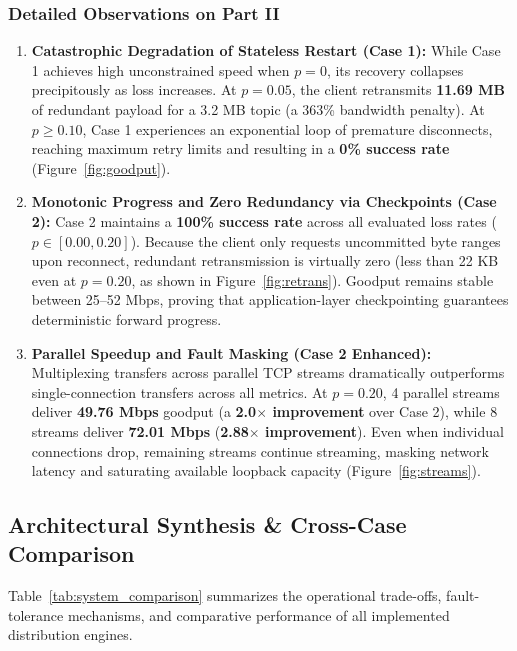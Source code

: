 \documentclass[11pt,a4paper]{article}
\begin{document}
\subsubsection{Detailed Observations on Part II}
\begin{enumerate}
    \item \textbf{Catastrophic Degradation of Stateless Restart (Case 1):}
    While Case 1 achieves high unconstrained speed when $p=0$, its recovery collapses precipitously as loss increases. At $p=0.05$, the client retransmits \textbf{11.69 MB} of redundant payload for a 3.2 MB topic (a 363\% bandwidth penalty). At $p \ge 0.10$, Case 1 experiences an exponential loop of premature disconnects, reaching maximum retry limits and resulting in a \textbf{0\% success rate} (Figure~\ref{fig:goodput}).
    
    \item \textbf{Monotonic Progress and Zero Redundancy via Checkpoints (Case 2):}
    Case 2 maintains a \textbf{100\% success rate} across all evaluated loss rates ($p \in [0.00, 0.20]$). Because the client only requests uncommitted byte ranges upon reconnect, redundant retransmission is virtually zero (less than 22 KB even at $p=0.20$, as shown in Figure~\ref{fig:retrans}). Goodput remains stable between 25--52 Mbps, proving that application-layer checkpointing guarantees deterministic forward progress.
    
    \item \textbf{Parallel Speedup and Fault Masking (Case 2 Enhanced):}
    Multiplexing transfers across parallel TCP streams dramatically outperforms single-connection transfers across all metrics. At $p=0.20$, 4 parallel streams deliver \textbf{49.76 Mbps} goodput (a \textbf{2.0$\times$ improvement} over Case 2), while 8 streams deliver \textbf{72.01 Mbps} (\textbf{2.88$\times$ improvement}). Even when individual connections drop, remaining streams continue streaming, masking network latency and saturating available loopback capacity (Figure~\ref{fig:streams}).
\end{enumerate}

\subsection{Architectural Synthesis \& Cross-Case Comparison}
Table~\ref{tab:system_comparison} summarizes the operational trade-offs, fault-tolerance mechanisms, and comparative performance of all implemented distribution engines.
\end{document}
